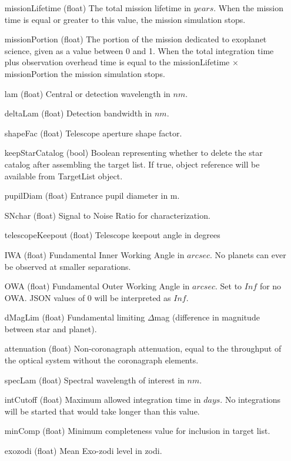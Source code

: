 \documentclass[cleanfoot]{asme2ej}
\begin{document}
\begin{itemize}[leftmargin=1in,font={\ttfamily}]
\item[missionLifetime] (float) The total mission lifetime in $ years $.  When the mission time is equal or greater to this value, the mission simulation stops.
\item[missionPortion] (float) The portion of the mission dedicated to exoplanet science, given as a value between 0 and 1.  When the total integration time plus observation overhead time is equal to the missionLifetime $\times$ missionPortion the mission simulation stops.
\item[lam]  (float) Central or detection wavelength in $ nm $.
\item[deltaLam]  (float) Detection bandwidth in $ nm $.
\item[shapeFac] (float)  Telescope aperture shape factor.
\item[keepStarCatalog] (bool) Boolean representing whether to delete the star catalog after assembling the target list.  If true, object reference will be available from TargetList object.
\item[pupilDiam] (float) Entrance pupil diameter in m.
\item[SNchar] (float) Signal to Noise Ratio for characterization.
\item[telescopeKeepout] (float) Telescope keepout angle in degrees
\item[IWA] (float) Fundamental Inner Working Angle in $ arcsec $. No planets can ever be observed at smaller separations.
\item[OWA] (float) Fundamental Outer Working Angle in $ arcsec $. Set to $ Inf $ for no OWA. JSON values of 0 will be interpreted as $ Inf $.
\item[dMagLim] (float) Fundamental limiting $\Delta$mag (difference in magnitude between star and planet). 
\item[attenuation] (float) Non-coronagraph attenuation, equal to the throughput of the optical system without the coronagraph elements.
\item[specLam] (float) Spectral wavelength of interest in $ nm $.
\item[intCutoff] (float)  Maximum allowed integration time in $ days $. No integrations will be started that would take longer than this value.
\item[minComp] (float) Minimum completeness value for inclusion in target list. 
\item[exozodi] (float) Mean Exo-zodi level in zodi.

\end{itemize}
\end{document}
